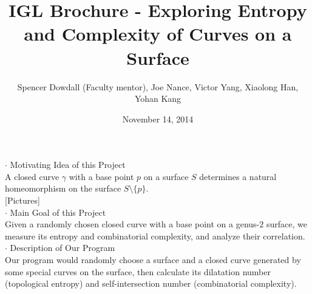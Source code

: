 \documentclass{article}
\begin{document}
\title{{\Large IGL Brochure - Exploring Entropy and Complexity of Curves on a Surface}}
\author{Spencer Dowdall (Faculty mentor),
	Joe Nance,
	Victor Yang,
	Xiaolong Han,
	Yohan Kang}
\date{November 14, 2014}
\maketitle

{\large $\cdot$ Motivating Idea of this Project}
\\

A closed curve $\gamma$ with a base point $p$ on a surface $S$ determines a natural homeomorphism on the surface $S\setminus\{p\}$.
\\

[Pictures]
\\

{\large $\cdot$ Main Goal of this Project}
\\

Given a randomly chosen closed curve with a base point on a genus-$2$ surface, we measure its entropy and combinatorial complexity, and analyze their correlation.
\\

{\large $\cdot$ Description of Our Program}
\\

Our program would randomly choose a surface and a closed curve generated by some special curves on the surface, then calculate its dilatation number (topological entropy) and self-intersection number (combinatorial complexity).
\end{document}
